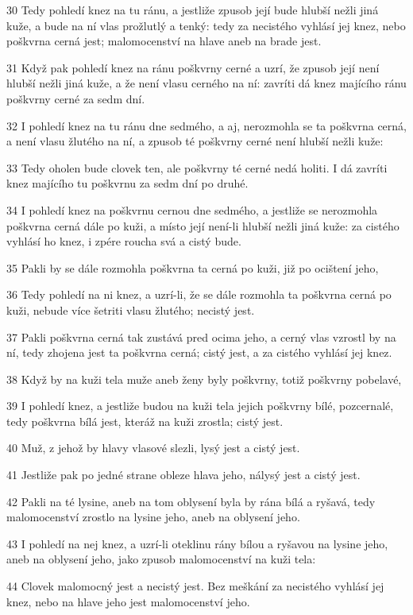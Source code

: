 \par 30 Tedy pohledí knez na tu ránu, a jestliže zpusob její bude hlubší nežli jiná kuže, a bude na ní vlas prožlutlý a tenký: tedy za necistého vyhlásí jej knez, nebo poškvrna cerná jest; malomocenství na hlave aneb na brade jest.
\par 31 Když pak pohledí knez na ránu poškvrny cerné a uzrí, že zpusob její není hlubší nežli jiná kuže, a že není vlasu cerného na ní: zavríti dá knez majícího ránu poškvrny cerné za sedm dní.
\par 32 I pohledí knez na tu ránu dne sedmého, a aj, nerozmohla se ta poškvrna cerná, a není vlasu žlutého na ní, a zpusob té poškvrny cerné není hlubší nežli kuže:
\par 33 Tedy oholen bude clovek ten, ale poškvrny té cerné nedá holiti. I dá zavríti knez majícího tu poškvrnu za sedm dní po druhé.
\par 34 I pohledí knez na poškvrnu cernou dne sedmého, a jestliže se nerozmohla poškvrna cerná dále po kuži, a místo její není-li hlubší nežli jiná kuže: za cistého vyhlásí ho knez, i zpére roucha svá a cistý bude.
\par 35 Pakli by se dále rozmohla poškvrna ta cerná po kuži, již po ocištení jeho,
\par 36 Tedy pohledí na ni knez, a uzrí-li, že se dále rozmohla ta poškvrna cerná po kuži, nebude více šetriti vlasu žlutého; necistý jest.
\par 37 Pakli poškvrna cerná tak zustává pred ocima jeho, a cerný vlas vzrostl by na ní, tedy zhojena jest ta poškvrna cerná; cistý jest, a za cistého vyhlásí jej knez.
\par 38 Když by na kuži tela muže aneb ženy byly poškvrny, totiž poškvrny pobelavé,
\par 39 I pohledí knez, a jestliže budou na kuži tela jejich poškvrny bílé, pozcernalé, tedy poškvrna bílá jest, kteráž na kuži zrostla; cistý jest.
\par 40 Muž, z jehož by hlavy vlasové slezli, lysý jest a cistý jest.
\par 41 Jestliže pak po jedné strane obleze hlava jeho, nálysý jest a cistý jest.
\par 42 Pakli na té lysine, aneb na tom oblysení byla by rána bílá a ryšavá, tedy malomocenství zrostlo na lysine jeho, aneb na oblysení jeho.
\par 43 I pohledí na nej knez, a uzrí-li oteklinu rány bílou a ryšavou na lysine jeho, aneb na oblysení jeho, jako zpusob malomocenství na kuži tela:
\par 44 Clovek malomocný jest a necistý jest. Bez meškání za necistého vyhlásí jej knez, nebo na hlave jeho jest malomocenství jeho.
